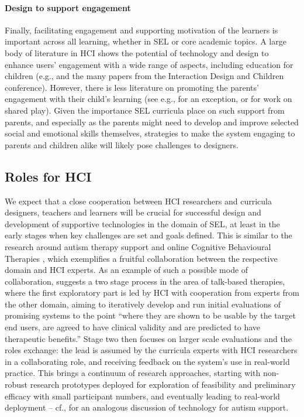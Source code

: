 \documentclass[prodmode,acmtochi]{acmsmall}
\begin{document}
\paragraph{Design to support engagement} Finally, facilitating engagement and supporting motivation of the learners is important across all learning, whether in SEL or core academic topics. A large body of literature in HCI shows the potential of technology and design to enhance users' engagement with a wide range of aspects, including education for children (e.g., \cite{Connolly2012,Bers2010} and the many papers from the Interaction Design and Children conference). However, there is less literature on promoting the parents' engagement with their child's learning (see e.g., \cite{Lewin2010} for an exception, or \cite{Raffle2010} for work on shared play). Given the importance SEL curricula place on such support from parents, and especially as the parents might need to develop and improve selected social and emotional skills themselves, strategies to make the system engaging to parents and children alike will likely pose challenges to designers.



\subsection{Roles for HCI}


We expect that a close cooperation between HCI researchers and curricula designers, teachers and learners will be crucial for successful design and development of supportive technologies in the domain of SEL, at least in the early stages when key challenges are set and goals defined. This is similar to the research around autism therapy support \cite{Kientz2013} and online Cognitive Behavioural Therapies \cite{Bendall2014,Porayska-Pomsta2011}, which exemplifies a fruitful collaboration between the respective domain and HCI experts.
%
As an example of such a possible mode of collaboration,  suggests a two stage process in the area of talk-based therapies, where the first exploratory part is led by HCI with cooperation from experts from the other domain, aiming to iteratively develop and run initial evaluations of promising systems to the point ``where they are shown to be usable by the target end users, are agreed to have clinical validity and are predicted to have therapeutic benefits.'' Stage two then focuses on larger scale evaluations and the roles exchange: the lead is assumed by the curricula experts with HCI researchers in a collaborating role, and receiving feedback on the system's use in real-world practice. 
%
This brings a continuum of research approaches, starting with non-robust research prototypes deployed for exploration of feasibility and preliminary efficacy with small participant numbers, and eventually leading to real-world deployment -- cf., \cite[p.105-1-06]{Kientz2013} for an analogous discussion of technology for autism support.
\end{document}
